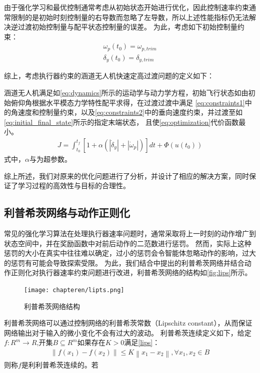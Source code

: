 由于强化学习和最优控制通常考虑从初始状态开始进行优化，因此控制速率约束通常限制的是初始时刻控制量的右导数而忽略了左导数，所以上述性能指标仍无法解决逆过渡初始控制量与配平状态控制量的误差。
为此，考虑如下初始控制量约束：
\begin{align}
    \omega_{p}(t_{0}) = \omega_{p,trim} \\
    \delta_{y}(t_{0}) = \delta_{y,trim}
\end{align}

综上，考虑执行器约束的涵道无人机快速定高过渡问题的定义如下：

涵道无人机满足如\autoref{eq:dynamics}所示的运动学与动力学方程，初始飞行状态如由初始俯仰角根据水平模态力学特性配平求得，在过渡过渡中满足
\autoref{eq:constraints1}中的角速度和控制量约束，以及\autoref{eq:constraints2}中的垂向速度约束，并过渡至如\autoref{eq:initial_final_state}所示的指定末端状态，
且使\autoref{eq:optimization}代价函数最小。
\begin{align}
    \label{eq:optimization}
    J = \int_{t_{0}}^{t_{f}}\left [ 1+\alpha (\left|\dot{\delta}_{y}\right| + \left|\dot{\omega}_{p}\right|) \right ]dt +\Phi (u(t_{0})) 
\end{align}
式中，$\alpha$与为超参数。

综上所述，我们对原来的优化问题进行了分析，并设计了相应的解决方案，同时保证了学习过程的高效性与目标的合理性。
\subsection{利普希茨网络与动作正则化}
常见的强化学习算法在处理执行器速率问题时，通常采取将上一时刻的动作增广到状态空间中，并在奖励函数中对前后动作的二范数进行惩罚\cite{kaufmann2023champion}。
然而，实际上这种惩罚的大小在真实中往往难以确定，过小的惩罚会令智能体忽略动作的影响，过大的惩罚有可能会导致探索受限。
为此，我们结合\parencite{song2023lipsnet}中提出的利普希茨网络并结合动作正则化对执行器速率约束问题进行改进，利普希茨网络的结构如\autoref{fig:lips}所示。
\begin{figure}[htbp]
    \centering
    \texttt{[image: chapteren/lipts.png]}
    \caption{\label{fig:lips}利普希茨网络结构}
\end{figure}

利普希茨网络可以通过控制网络的利普希茨常数（Lipschitz constant），从而保证网络输出对于输入的微小变化不会有过大的波动。
利普希茨连续定义如下，给定$f: R^{m} \rightarrow R$,开集$B \subseteq R^{m}$如果存在$K>0$满足\autoref{lips}：
\begin{align}
    \label{eq:lips}
    \left\|f\left(x_{1}\right)-f\left(x_{2}\right)\right\| \leq K\left\|x_{1}-x_{2}\right\|, \forall x_{1}, x_{2} \in B
\end{align}
则称$f$是利利普希茨连续的。若

